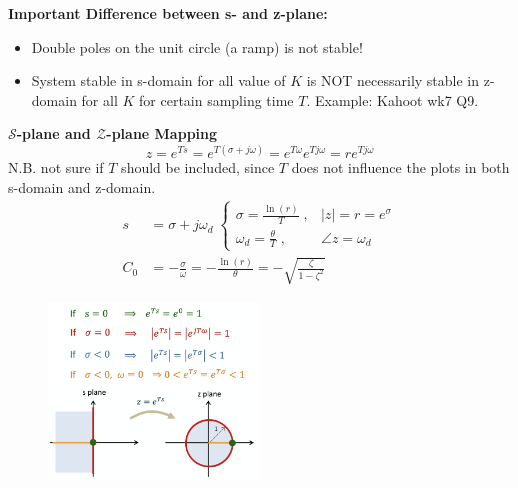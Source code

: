 \textbf{\large Important Difference between s- and z-plane:} 
\begin{itemize}
    \item Double poles on the unit circle (a ramp) is not stable!
    \item System stable in s-domain for all value of $K$ is NOT necessarily stable in z-domain for all $K$ for certain sampling time $T$. Example: Kahoot wk7 Q9.
\end{itemize}

\textbf{\large $\mathcal{S}$-plane and $\mathcal{Z}$-plane Mapping}
\begin{equation*}
    z= e^{Ts} = e^{T(\sigma + j \omega)} = e^{T\omega} e^{T j\omega} = r e^{T j\omega}
\end{equation*}
N.B. not sure if $T$ should be included, since $T$ does not influence the plots in both s-domain and z-domain.
\begin{align*}
    s &= \sigma + j \omega_d \; \begin{cases}
    \sigma = \frac{\ln(r)}{T}\; , & |z| = r = e^{\sigma} \\
    \omega_d = \frac{\theta}{T} \; , & \angle z = \omega_d 
    \end{cases} \\
    C_0 &= -\frac{\sigma}{\omega} = - \frac{\ln(r)}{\theta} = -\sqrt{\frac{\zeta}{1-\zeta^2}} 
\end{align*}
\begin{figure}[H]
    \centering
    \includegraphics[width=0.5\textwidth]{images/s_z_mapping.png}
\end{figure}

